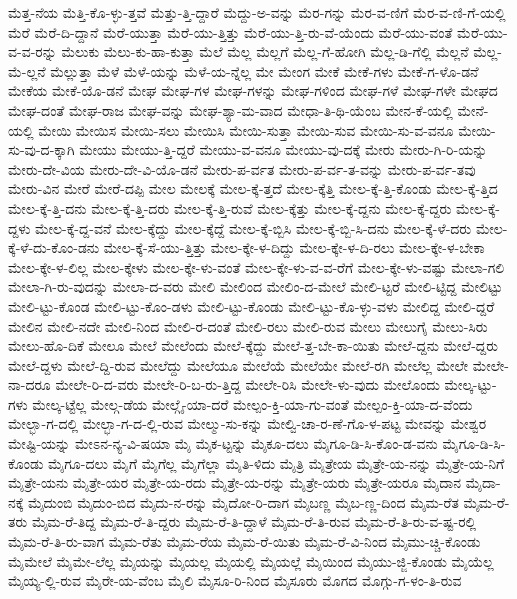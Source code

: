 {ಮೆತ್ತ-ನೆಯ
ಮೆತ್ತಿ-ಕೊ-ಳ್ಳು-ತ್ತವೆ
ಮೆತ್ತು-ತ್ತಿ-ದ್ದಾರೆ
ಮೆದ್ದು-ಅ-ವನ್ನು
ಮೆರ-ಗನ್ನು
ಮೆರ-ವ-ಣಿಗೆ
ಮೆರ-ವ-ಣಿ-ಗೆ-ಯಲ್ಲಿ
ಮೆರೆ
ಮೆರೆ-ದಿ-ದ್ದಾನೆ
ಮೆರೆ-ಯುತ್ತಾ
ಮೆರೆ-ಯು-ತ್ತಿತ್ತು
ಮೆರೆ-ಯು-ತ್ತಿ-ರು-ವೆ-ಯೆಂದು
ಮೆರೆ-ಯು-ವಂತೆ
ಮೆರೆ-ಯು-ವ-ವ-ರನ್ನು
ಮೆಲುಕು
ಮೆಲು-ಕು-ಹಾ-ಕುತ್ತಾ
ಮೆಲೆ
ಮೆಲ್ಲ
ಮೆಲ್ಲಗೆ
ಮೆಲ್ಲ-ಗೆ-ಹೋಗಿ
ಮೆಲ್ಲ-ಡಿ-ಗೆಲ್ಲಿ
ಮೆಲ್ಲನೆ
ಮೆಲ್ಲ-ಮೆ-ಲ್ಲನೆ
ಮೆಲ್ಲುತ್ತಾ
ಮೆಳೆ
ಮೆಳೆ-ಯನ್ನು
ಮೆಳೆ-ಯ-ನ್ನೆಲ್ಲ
ಮೇ
ಮೇಂಗ
ಮೇಕೆ
ಮೇಕೆ-ಗಳು
ಮೇಕೆ-ಗ-ಳೊ-ಡನೆ
ಮೇಕೆಯ
ಮೇಕೆ-ಯೊ-ಡನೆ
ಮೇಘ
ಮೇಘ-ಗಳ
ಮೇಘ-ಗಳನ್ನು
ಮೇಘ-ಗಳಿಂದ
ಮೇಘ-ಗಳೆ
ಮೇಘ-ಗಳೇ
ಮೇಘದ
ಮೇಘ-ದಂತೆ
ಮೇಘ-ರಾಜ
ಮೇಘ-ವನ್ನು
ಮೇಘ-ಶ್ಯಾ-ಮ-ವಾದ
ಮೇಧಾ-ತಿ-ಥಿ-ಯೆಂಬ
ಮೇನ-ಕೆ-ಯಲ್ಲಿ
ಮೇನೆ-ಯಲ್ಲಿ
ಮೇಯಿ
ಮೇಯಿಸ
ಮೇಯಿ-ಸಲು
ಮೇಯಿಸಿ
ಮೇಯಿ-ಸುತ್ತಾ
ಮೇಯಿ-ಸುವ
ಮೇಯಿ-ಸು-ವ-ವನೂ
ಮೇಯಿ-ಸು-ವು-ದ-ಕ್ಕಾಗಿ
ಮೇಯು
ಮೇಯು-ತ್ತಿ-ದ್ದರೆ
ಮೇಯು-ವ-ವನೂ
ಮೇಯು-ವು-ದಕ್ಕೆ
ಮೇರು
ಮೇರು-ಗಿ-ರಿ-ಯನ್ನು
ಮೇರು-ದೇ-ವಿಯ
ಮೇರು-ದೇ-ವಿ-ಯೊ-ಡನೆ
ಮೇರು-ಪ-ರ್ವತ
ಮೇರು-ಪ-ರ್ವ-ತ-ವನ್ನು
ಮೇರು-ಪ-ರ್ವ-ತವು
ಮೇರು-ವಿನ
ಮೇರೆ
ಮೇರೆ-ದಪ್ಪಿ
ಮೇಲ
ಮೇಲಕ್ಕೆ
ಮೇಲ-ಕ್ಕೆ-ತ್ತದೆ
ಮೇಲ-ಕ್ಕೆತ್ತಿ
ಮೇಲ-ಕ್ಕೆ-ತ್ತಿ-ಕೊಂಡು
ಮೇಲ-ಕ್ಕೆ-ತ್ತಿದ
ಮೇಲ-ಕ್ಕೆ-ತ್ತಿ-ದನು
ಮೇಲ-ಕ್ಕೆ-ತ್ತಿ-ದರು
ಮೇಲ-ಕ್ಕೆ-ತ್ತಿ-ರುವೆ
ಮೇಲ-ಕ್ಕೆತ್ತು
ಮೇಲ-ಕ್ಕೆ-ದ್ದನು
ಮೇಲ-ಕ್ಕೆ-ದ್ದರು
ಮೇಲ-ಕ್ಕೆ-ದ್ದಳು
ಮೇಲ-ಕ್ಕೆ-ದ್ದ-ವನೆ
ಮೇಲ-ಕ್ಕೆದ್ದು
ಮೇಲ-ಕ್ಕೆದ್ದೆ
ಮೇಲ-ಕ್ಕೆ-ಬ್ಬಿಸಿ
ಮೇಲ-ಕ್ಕೆ-ಬ್ಬಿ-ಸಿ-ದನು
ಮೇಲ-ಕ್ಕೆ-ಳೆ-ದರು
ಮೇಲ-ಕ್ಕೆ-ಳೆ-ದು-ಕೊಂ-ಡನು
ಮೇಲ-ಕ್ಕೆ-ಸೆ-ಯು-ತ್ತಿತ್ತು
ಮೇಲ-ಕ್ಕೇ-ಳ-ದಿದ್ದು
ಮೇಲ-ಕ್ಕೇ-ಳ-ದಿ-ರಲು
ಮೇಲ-ಕ್ಕೇ-ಳ-ಬೇಕಾ
ಮೇಲ-ಕ್ಕೇ-ಳ-ಲಿಲ್ಲ
ಮೇಲ-ಕ್ಕೇಳು
ಮೇಲ-ಕ್ಕೇ-ಳು-ವಂತೆ
ಮೇಲ-ಕ್ಕೇ-ಳು-ವ-ವ-ರೆಗೆ
ಮೇಲ-ಕ್ಕೇ-ಳು-ವಷ್ಟು
ಮೇಲಾ-ಗಲಿ
ಮೇಲಾ-ಗಿ-ರು-ವುದನ್ನು
ಮೇಲಾ-ದ-ವರು
ಮೇಲಿ
ಮೇಲಿಂದ
ಮೇಲಿಂ-ದ-ಮೇಲೆ
ಮೇಲಿ-ಟ್ಟರೆ
ಮೇಲಿ-ಟ್ಟಿದ್ದ
ಮೇಲಿಟ್ಟು
ಮೇಲಿ-ಟ್ಟು-ಕೊಂಡ
ಮೇಲಿ-ಟ್ಟು-ಕೊಂ-ಡಳು
ಮೇಲಿ-ಟ್ಟು-ಕೊಂಡು
ಮೇಲಿ-ಟ್ಟು-ಕೊ-ಳ್ಳು-ವಳು
ಮೇಲಿದ್ದ
ಮೇಲಿ-ದ್ದರೆ
ಮೇಲಿನ
ಮೇಲಿ-ನದೇ
ಮೇಲಿ-ನಿಂದ
ಮೇಲಿ-ರ-ದಂತೆ
ಮೇಲಿ-ರಲು
ಮೇಲಿ-ರುವ
ಮೇಲು
ಮೇಲುಗೈ
ಮೇಲು-ಸಿರು
ಮೇಲು-ಹೊ-ದಿಕೆ
ಮೇಲೂ
ಮೇಲೆ
ಮೇಲೆಂದು
ಮೇಲೆ-ಕ್ಕೆದ್ದು
ಮೇಲೆ-ತ್ತ-ಬೇ-ಕಾ-ಯಿತು
ಮೇಲೆ-ದ್ದನು
ಮೇಲೆ-ದ್ದರು
ಮೇಲೆ-ದ್ದಳು
ಮೇಲೆ-ದ್ದಿ-ರುವ
ಮೇಲೆದ್ದು
ಮೇಲೆಯೂ
ಮೇಲೆಯೆ
ಮೇಲೆಯೇ
ಮೇಲೆ-ರಗಿ
ಮೇಲೆಲ್ಲ
ಮೇಲೇ
ಮೇಲೇ-ನಾ-ದರೂ
ಮೇಲೇ-ರಿ-ದ-ವರು
ಮೇಲೇ-ರಿ-ಬ-ರು-ತ್ತಿದ್ದ
ಮೇಲೇ-ರಿಸಿ
ಮೇಲೇ-ಳು-ವುದು
ಮೇಲೊಂದು
ಮೇಲ್ಕ-ಟ್ಟು-ಗಳು
ಮೇಲ್ಕ-ಟ್ಟೆಲ್ಲ
ಮೇಲ್ಗ-ಡೆಯ
ಮೇಲ್ಗೈ-ಯಾ-ದರೆ
ಮೇಲ್ಪಂ-ಕ್ತಿ-ಯಾ-ಗು-ವಂತೆ
ಮೇಲ್ಪಂ-ಕ್ತಿ-ಯಾ-ದ-ವೆಂದು
ಮೇಲ್ಭಾ-ಗ-ದಲ್ಲಿ
ಮೇಲ್ಭಾ-ಗ-ದ-ಲ್ಲಿ-ರುವ
ಮೇಲ್ಮು-ಸು-ಕನ್ನು
ಮೇಲ್ವಿ-ಚಾ-ರ-ಣೆ-ಗೊ-ಳ-ಪಟ್ಟ
ಮೇವನ್ನು
ಮೇಶ್ವರ
ಮೇಷ್ಟಿ-ಯನ್ನು
ಮೇಽನ-ನ್ಯ-ವಿ-ಷಯಾ
ಮೈ
ಮೈಕ-ಟ್ಟನ್ನು
ಮೈಕೂ-ದಲು
ಮೈಗೂ-ಡಿ-ಸಿ-ಕೊಂ-ಡ-ವನು
ಮೈಗೂ-ಡಿ-ಸಿ-ಕೊಂಡು
ಮೈಗೂ-ದಲು
ಮೈಗೆ
ಮೈಗೆಲ್ಲ
ಮೈಗೆಲ್ಲಾ
ಮೈತಿ-ಳಿದು
ಮೈತ್ರಿ
ಮೈತ್ರೇಯ
ಮೈತ್ರೇ-ಯ-ನನ್ನು
ಮೈತ್ರೇ-ಯ-ನಿಗೆ
ಮೈತ್ರೇ-ಯನು
ಮೈತ್ರೇ-ಯರ
ಮೈತ್ರೇ-ಯ-ರದು
ಮೈತ್ರೇ-ಯ-ರನ್ನು
ಮೈತ್ರೇ-ಯರು
ಮೈತ್ರೇ-ಯರೂ
ಮೈದಾನ
ಮೈದಾ-ನಕ್ಕೆ
ಮೈದುಂಬಿ
ಮೈದುಂ-ಬಿದ
ಮೈದು-ನ-ರನ್ನು
ಮೈದೋ-ರಿ-ದಾಗ
ಮೈಬಣ್ಣ
ಮೈಬ-ಣ್ಣ-ದಿಂದ
ಮೈಮ-ರೆತ
ಮೈಮ-ರೆ-ತರು
ಮೈಮ-ರೆ-ತಿದ್ದ
ಮೈಮ-ರೆ-ತಿ-ದ್ದರು
ಮೈಮ-ರೆ-ತಿ-ದ್ದಾಳೆ
ಮೈಮ-ರೆ-ತಿ-ರುವ
ಮೈಮ-ರೆ-ತಿ-ರು-ವ-ಷ್ಟ-ರಲ್ಲಿ
ಮೈಮ-ರೆ-ತಿ-ರು-ವಾಗ
ಮೈಮ-ರೆತು
ಮೈಮ-ರೆಯ
ಮೈಮ-ರೆ-ಯಿತು
ಮೈಮ-ರೆ-ವಿ-ನಿಂದ
ಮೈಮು-ಚ್ಚಿ-ಕೊಂಡು
ಮೈಮೇಲೆ
ಮೈಮೇ-ಲೆಲ್ಲ
ಮೈಯನ್ನು
ಮೈಯಲ್ಲ
ಮೈಯಲ್ಲಿ
ಮೈಯಲ್ಲೆ
ಮೈಯಿಂದ
ಮೈಯು-ಜ್ಜಿ-ಕೊಂಡು
ಮೈಯೆಲ್ಲ
ಮೈಯ್ಯ-ಲ್ಲಿ-ರುವ
ಮೈರೇ-ಯ-ವೆಂಬ
ಮೈಲಿ
ಮೈಸೂ-ರಿ-ನಿಂದ
ಮೈಸೂರು
ಮೊಗದ
ಮೊಗ್ಗು-ಗ-ಳಂ-ತಿ-ರುವ
}

